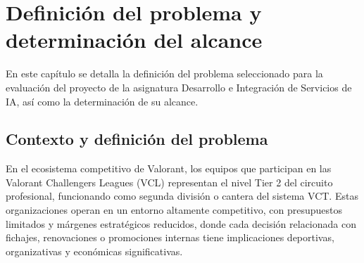\documentclass{ULBreport} %
\begin{document}

\tableofcontents
\listoftables
\listoffigures


\chapter{Definición del problema y determinación del alcance}

En este capítulo se detalla la definición del problema seleccionado para la evaluación del proyecto de la asignatura Desarrollo e Integración de Servicios de IA, así como la determinación de su alcance.

\section{Contexto y definición del problema}

En el ecosistema competitivo de Valorant, los equipos que participan en las Valorant Challengers Leagues (VCL) representan el nivel Tier 2 del circuito profesional, funcionando como segunda división o cantera del sistema VCT. Estas organizaciones operan en un entorno altamente competitivo, con presupuestos limitados y márgenes estratégicos reducidos, donde cada decisión relacionada con fichajes, renovaciones o promociones internas tiene implicaciones deportivas, organizativas y económicas significativas.
\end{document}
